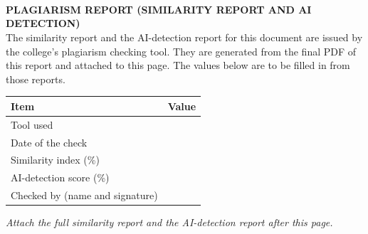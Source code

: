 \chapter*{}                  %
\\[0.3cm]
{\Large\bfseries PLAGIARISM REPORT (SIMILARITY REPORT AND AI DETECTION)}\\[0.3cm]

The similarity report and the AI-detection report for this document are issued by the college's plagiarism checking tool. They are generated from the final PDF of this report and attached to this page. The values below are to be filled in from those reports.

\begin{center}
\small{}
\begin{tabular}{|p{6.5cm}|p{6.0cm}|}
\hline
\textbf{Item} & \textbf{Value} \\ \hline
Tool used & \\[0.4cm] \hline
Date of the check & \\[0.4cm] \hline
Similarity index (\%) & \\[0.4cm] \hline
AI-detection score (\%) & \\[0.4cm] \hline
Checked by (name and signature) & \\[0.6cm] \hline
\end{tabular}
\end{center}

\vspace{0.5cm}
\noindent\textit{Attach the full similarity report and the AI-detection report after this page.}
